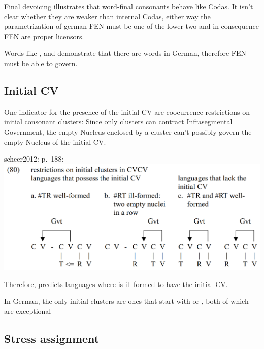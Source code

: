 Final devoicing illustrates that word-final consonants behave like Codas.
It isn't clear whether they are weaker than internal Codas, either way the
parametrization of german FEN must be one of the lower two and in consequence
FEN are proper licensors.

Words like ,  and  demonstrate that there
are  words in German, therefore FEN must be able to govern.


\subsection{Initial CV}
One indicator for the presence of the initial CV are coocurrence restrictions
on initial consonant clusters:
Since only  clusters can contract Infrasegmental Government,
the empty Nucleus enclosed by a  cluster can't possibly govern
the empty Nucleus of the initial CV.

scheer2012: p.~188:
\includegraphics[width=.5\textwidth]{figures/scheer2012_initial-cv-initial-clusters.png}

Therefore, \CVCV predicts languages where  is ill-formed to have
the initial CV.

In German, the only initial  clusters are ones that start with
\textipa{[s]} or \textipa{[S]}, both of which are exceptional \TODO{}



\subsection{Stress assignment}
\TODO{}